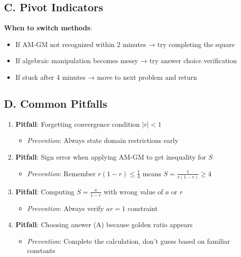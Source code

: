 \documentclass[12pt]{article}
\begin{document}
\begin{roadmapbox}
\subsection*{C. Pivot Indicators}

\textbf{When to switch methods}:
\begin{itemize}[leftmargin=*]
    \item If AM-GM not recognized within 2 minutes → try completing the square
    \item If algebraic manipulation becomes messy → try answer choice verification
    \item If stuck after 4 minutes → move to next problem and return
\end{itemize}

\subsection*{D. Common Pitfalls}

\begin{enumerate}[leftmargin=*]
    \item \textbf{Pitfall}: Forgetting convergence condition $|r| < 1$
    \begin{itemize}
        \item \textit{Prevention}: Always state domain restrictions early
    \end{itemize}
    
    \item \textbf{Pitfall}: Sign error when applying AM-GM to get inequality for $S$
    \begin{itemize}
        \item \textit{Prevention}: Remember $r(1-r) \leq \frac{1}{4}$ means $S = \frac{1}{r(1-r)} \geq 4$
    \end{itemize}
    
    \item \textbf{Pitfall}: Computing $S = \frac{a}{1-r}$ with wrong value of $a$ or $r$
    \begin{itemize}
        \item \textit{Prevention}: Always verify $ar = 1$ constraint
    \end{itemize}
    
    \item \textbf{Pitfall}: Choosing answer (A) because golden ratio appears
    \begin{itemize}
        \item \textit{Prevention}: Complete the calculation, don't guess based on familiar constants
    \end{itemize}
\end{enumerate}
\end{roadmapbox}
\end{document}
